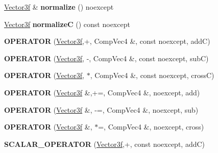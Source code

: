 \begin{DoxyCompactItemize}
\mbox{\label{class_vector3f_a9e4da46a9d72284e1bb75cdd07f64c97}} 
\mbox{\hyperlink{class_vector3f}{Vector3f}} \& {\bfseries normalize} () noexcept
\item 
\mbox{\label{class_vector3f_a4caf414ea37f685de9f080bcbd791203}} 
\mbox{\hyperlink{class_vector3f}{Vector3f}} {\bfseries normalizeC} () const noexcept
\item 
\mbox{\label{class_vector3f_aafd59ed86521aa17c500d2b5ac3838d3}} 
{\bfseries O\+P\+E\+R\+A\+T\+OR} (\mbox{\hyperlink{class_vector3f}{Vector3f}},+, Comp\+Vec4 \&, const noexcept, addC)
\item 
\mbox{\label{class_vector3f_ad3883c24f80f122c7fa1f013170d0bbe}} 
{\bfseries O\+P\+E\+R\+A\+T\+OR} (\mbox{\hyperlink{class_vector3f}{Vector3f}}, -\/, Comp\+Vec4 \&, const noexcept, subC)
\item 
\mbox{\label{class_vector3f_a8360918e7b9e647000d9f9a03918b3e6}} 
{\bfseries O\+P\+E\+R\+A\+T\+OR} (\mbox{\hyperlink{class_vector3f}{Vector3f}}, $\ast$, Comp\+Vec4 \&, const noexcept, crossC)
\item 
\mbox{\label{class_vector3f_a1021701786c76b3b11bf563db1be3cdb}} 
{\bfseries O\+P\+E\+R\+A\+T\+OR} (\mbox{\hyperlink{class_vector3f}{Vector3f}} \&,+=, Comp\+Vec4 \&, noexcept, add)
\item 
\mbox{\label{class_vector3f_acf226a1ec20e129f3721bd3230412745}} 
{\bfseries O\+P\+E\+R\+A\+T\+OR} (\mbox{\hyperlink{class_vector3f}{Vector3f}} \&, -\/=, Comp\+Vec4 \&, noexcept, sub)
\item 
\mbox{\label{class_vector3f_a76103dbe4e8e5ce5ea4f67d2fa57eb6b}} 
{\bfseries O\+P\+E\+R\+A\+T\+OR} (\mbox{\hyperlink{class_vector3f}{Vector3f}} \&, $\ast$=, Comp\+Vec4 \&, noexcept, cross)
\item 
\mbox{\label{class_vector3f_aa5cdf02ffc57ee17c80ba05f86597a90}} 
{\bfseries S\+C\+A\+L\+A\+R\+\_\+\+O\+P\+E\+R\+A\+T\+OR} (\mbox{\hyperlink{class_vector3f}{Vector3f}},+, const noexcept, addC)
\item 
\mbox{\label{class_vector3f_a3912940c33698b03767a4509d187b76e}} 

\end{DoxyCompactItemize}
